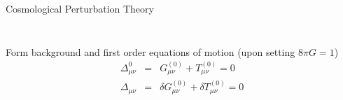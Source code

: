 \documentclass[8pt]{beamer}
\begin{document}
\begin{frame}{Cosmological Perturbation Theory}
\begin{columns}
\begin{column}{0.3\linewidth}
\begin{figure}[t]
			\end{figure}
			\footnotemark
		\end{column}
	\end{columns}
	\vspace{1em}
	Form background and first order equations of motion (upon setting $8\pi G=1$)
	\begin{eqnarray*}
		\Delta_{\mu\nu}^{0} &=& G_{\mu\nu}^{(0)} + T_{\mu\nu}^{(0)} =0
		\\
		\Delta_{\mu\nu} &=& \delta G_{\mu\nu}^{(0)} + \delta T_{\mu\nu}^{(0)}=0
	\end{eqnarray*}
\end{frame}

\end{document}
